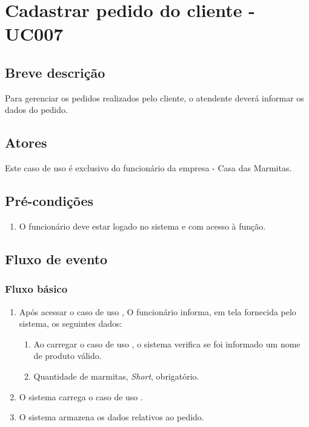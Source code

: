 \chapter{Cadastrar pedido do cliente - UC007} \label{uc007}

\section{Breve descrição}

Para gerenciar os pedidos realizados pelo cliente, o atendente deverá informar os dados do pedido.

\section{Atores}

Este caso de uso é exclusivo do funcionário da empresa - Casa das Marmitas.

\section{Pré-condições}

\begin{enumerate}
	\item O funcionário deve estar logado no sistema e com acesso à função.
\end{enumerate}

\section{Fluxo de evento}

\subsection{Fluxo básico}

\begin{enumerate}
	\item Após acessar o caso de uso , O funcionário informa, em tela fornecida pelo sistema, os seguintes dados:
	\begin{enumerate}
		\item Ao carregar o caso de uso , o sistema verifica se foi informado um nome de produto válido.
		\item Quantidade de marmitas, \emph{Short}, obrigatório.		
	\end{enumerate}
	\item O sistema carrega o caso de uso .
	\item O sistema armazena os dados relativos ao pedido.
\end{enumerate}


